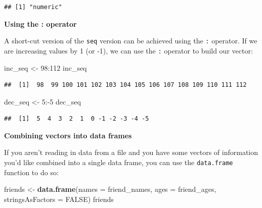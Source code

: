 \documentclass[]{tufte-book}
\newenvironment{Shaded}{\begin{snugshade}}{\end{snugshade}}
\newcommand{\KeywordTok}[1]{\textcolor[rgb]{0.13,0.29,0.53}{\textbf{{#1}}}}
\newcommand{\DataTypeTok}[1]{\textcolor[rgb]{0.13,0.29,0.53}{{#1}}}
\newcommand{\DecValTok}[1]{\textcolor[rgb]{0.00,0.00,0.81}{{#1}}}
\newcommand{\StringTok}[1]{\textcolor[rgb]{0.31,0.60,0.02}{{#1}}}
\newcommand{\OtherTok}[1]{\textcolor[rgb]{0.56,0.35,0.01}{{#1}}}
\newcommand{\NormalTok}[1]{{#1}}
\theoremstyle{definition}
\theoremstyle{definition}
\theoremstyle{remark}
\begin{document}
\begin{verbatim}
## [1] "numeric"
\end{verbatim}

\vspace*{0.2in}

\noindent\textbf{Using the : operator}\vspace*{0.1in}

A short-cut version of the \texttt{seq} version can be achieved using
the \texttt{:} operator. If we are increasing values by 1 (or -1), we
can use the \texttt{:} operator to build our vector:

\begin{Shaded}
\begin{Highlighting}[]
\NormalTok{inc_seq <-}\StringTok{ }\DecValTok{98}\NormalTok{:}\DecValTok{112}
\NormalTok{inc_seq}
\end{Highlighting}
\end{Shaded}

\begin{verbatim}
##  [1]  98  99 100 101 102 103 104 105 106 107 108 109 110 111 112
\end{verbatim}

\begin{Shaded}
\begin{Highlighting}[]
\NormalTok{dec_seq <-}\StringTok{ }\DecValTok{5}\NormalTok{:-}\DecValTok{5}
\NormalTok{dec_seq}
\end{Highlighting}
\end{Shaded}

\begin{verbatim}
##  [1]  5  4  3  2  1  0 -1 -2 -3 -4 -5
\end{verbatim}

\vspace*{0.2in}

\noindent\textbf{Combining vectors into data frames}\vspace*{0.1in}

If you aren't reading in data from a file and you have some vectors of
information you'd like combined into a single data frame, you can use
the \texttt{data.frame} function to do so:

\begin{Shaded}
\begin{Highlighting}[]
\NormalTok{friends <-}\StringTok{ }\KeywordTok{data.frame}\NormalTok{(}\DataTypeTok{names =} \NormalTok{friend_names, }
                      \DataTypeTok{ages =} \NormalTok{friend_ages,}
                      \DataTypeTok{stringsAsFactors =} \OtherTok{FALSE}\NormalTok{)}
\NormalTok{friends}
\end{Highlighting}
\end{Shaded}
\end{document}
